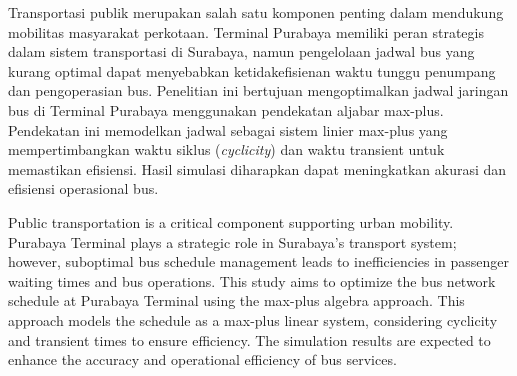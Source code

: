 \documentclass{file/TA-ITS}
\theoremstyle{definition}
\theoremstyle{definition}
\theoremstyle{plain}
\begin{document}

\BagianAwal
\LembarJudul
\LembarPengesahan

\begin{Abstrak}
Transportasi publik merupakan salah satu komponen penting dalam mendukung mobilitas masyarakat perkotaan. Terminal Purabaya memiliki peran strategis dalam sistem transportasi di Surabaya, namun pengelolaan jadwal bus yang kurang optimal dapat menyebabkan ketidakefisienan waktu tunggu penumpang dan pengoperasian bus. Penelitian ini bertujuan mengoptimalkan jadwal jaringan bus di Terminal Purabaya menggunakan pendekatan aljabar max-plus. Pendekatan ini memodelkan jadwal sebagai sistem linier max-plus yang mempertimbangkan waktu siklus (\textit{cyclicity}) dan waktu transient untuk memastikan efisiensi. Hasil simulasi diharapkan dapat meningkatkan akurasi dan efisiensi operasional bus.

\end{Abstrak}

\begin{Abstract}
Public transportation is a critical component supporting urban mobility. Purabaya Terminal plays a strategic role in Surabaya's transport system; however, suboptimal bus schedule management leads to inefficiencies in passenger waiting times and bus operations. This study aims to optimize the bus network schedule at Purabaya Terminal using the max-plus algebra approach. This approach models the schedule as a max-plus linear system, considering cyclicity and transient times to ensure efficiency. The simulation results are expected to enhance the accuracy and operational efficiency of bus services.

\end{Abstract}



\DaftarIsi\raggedbottom

\DaftarGambar

\DaftarTabel
\end{document}

